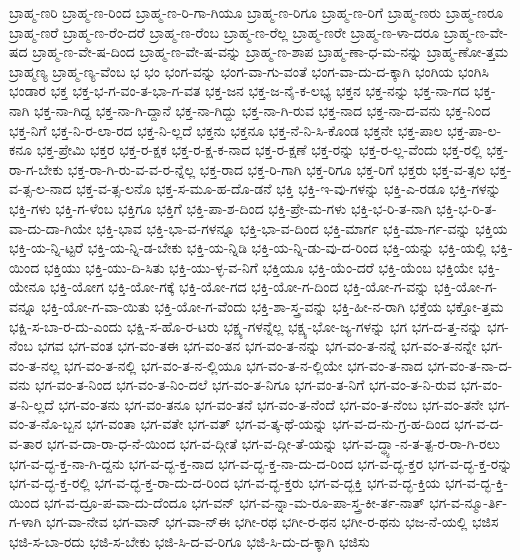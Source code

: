 {ಬ್ರಾಹ್ಮ-ಣರಿ
ಬ್ರಾಹ್ಮ-ಣ-ರಿಂದ
ಬ್ರಾಹ್ಮ-ಣ-ರಿ-ಗಾ-ಗಿಯೂ
ಬ್ರಾಹ್ಮ-ಣ-ರಿಗೂ
ಬ್ರಾಹ್ಮ-ಣ-ರಿಗೆ
ಬ್ರಾಹ್ಮ-ಣರು
ಬ್ರಾಹ್ಮ-ಣರೂ
ಬ್ರಾಹ್ಮ-ಣರೆ
ಬ್ರಾಹ್ಮ-ಣ-ರೆಂ-ದರೆ
ಬ್ರಾಹ್ಮ-ಣ-ರೆಂಬ
ಬ್ರಾಹ್ಮ-ಣ-ರೆಲ್ಲ
ಬ್ರಾಹ್ಮ-ಣರೇ
ಬ್ರಾಹ್ಮ-ಣ-ಳಾ-ದರೂ
ಬ್ರಾಹ್ಮ-ಣ-ವೇ-ಷದ
ಬ್ರಾಹ್ಮ-ಣ-ವೇ-ಷ-ದಿಂದ
ಬ್ರಾಹ್ಮ-ಣ-ವೇ-ಷ-ವನ್ನು
ಬ್ರಾಹ್ಮ-ಣ-ಶಾಪ
ಬ್ರಾಹ್ಮ-ಣಾ-ಧ-ಮ-ನನ್ನು
ಬ್ರಾಹ್ಮ-ಣೋ-ತ್ತಮ
ಬ್ರಾಹ್ಮಣ್ಯ
ಬ್ರಾಹ್ಮ-ಣ್ಯ-ವೆಂಬ
ಭ
ಭಂ
ಭಂಗ-ವನ್ನು
ಭಂಗ-ವಾ-ಗು-ವಂತೆ
ಭಂಗ-ವಾ-ದು-ದ-ಕ್ಕಾಗಿ
ಭಂಗಿಯ
ಭಂಗಿಸಿ
ಭಂಡಾರ
ಭಕ್ತ
ಭಕ್ತ-ಭ-ಗ-ವಂ-ತ-ಭಾ-ಗ-ವತ
ಭಕ್ತ-ಜನ
ಭಕ್ತ-ಜ-ನೈ-ಕ-ಲಭ್ಯ
ಭಕ್ತನ
ಭಕ್ತ-ನನ್ನು
ಭಕ್ತ-ನಾ-ಗದ
ಭಕ್ತ-ನಾಗಿ
ಭಕ್ತ-ನಾ-ಗಿದ್ದ
ಭಕ್ತ-ನಾ-ಗಿ-ದ್ದಾನೆ
ಭಕ್ತ-ನಾ-ಗಿದ್ದು
ಭಕ್ತ-ನಾ-ಗಿ-ರುವ
ಭಕ್ತ-ನಾದ
ಭಕ್ತ-ನಾ-ದ-ವನು
ಭಕ್ತ-ನಿಂದ
ಭಕ್ತ-ನಿಗೆ
ಭಕ್ತ-ನಿ-ರ-ಲಾ-ರದ
ಭಕ್ತ-ನಿ-ಲ್ಲದೆ
ಭಕ್ತನು
ಭಕ್ತನೂ
ಭಕ್ತ-ನೆ-ನಿ-ಸಿ-ಕೊಂಡ
ಭಕ್ತನೇ
ಭಕ್ತ-ಪಾಲ
ಭಕ್ತ-ಪಾ-ಲ-ಕನೂ
ಭಕ್ತ-ಪ್ರೇಮಿ
ಭಕ್ತರ
ಭಕ್ತ-ರ-ಕ್ಷಕ
ಭಕ್ತ-ರ-ಕ್ಷ-ಕ-ನಾದ
ಭಕ್ತ-ರ-ಕ್ಷಣೆ
ಭಕ್ತ-ರನ್ನು
ಭಕ್ತ-ರ-ಲ್ಲ-ವೆಂದು
ಭಕ್ತ-ರಲ್ಲಿ
ಭಕ್ತ-ರಾ-ಗ-ಬೇಕು
ಭಕ್ತ-ರಾ-ಗಿ-ರು-ವ-ವ-ರ-ನ್ನೆಲ್ಲ
ಭಕ್ತ-ರಾದ
ಭಕ್ತ-ರಿ-ಗಾಗಿ
ಭಕ್ತ-ರಿಗೂ
ಭಕ್ತ-ರಿಗೆ
ಭಕ್ತರು
ಭಕ್ತ-ವ-ತ್ಸಲ
ಭಕ್ತ-ವ-ತ್ಸ-ಲ-ನಾದ
ಭಕ್ತ-ವ-ತ್ಸ-ಲನೊ
ಭಕ್ತ-ಸ-ಮೂ-ಹ-ದೊ-ಡನೆ
ಭಕ್ತಿ
ಭಕ್ತಿ-ಇ-ವು-ಗಳನ್ನು
ಭಕ್ತಿ-ಎ-ರಡೂ
ಭಕ್ತಿ-ಗಳನ್ನು
ಭಕ್ತಿ-ಗಳು
ಭಕ್ತಿ-ಗ-ಳೆಂಬ
ಭಕ್ತಿಗೂ
ಭಕ್ತಿಗೆ
ಭಕ್ತಿ-ಪಾ-ಶ-ದಿಂದ
ಭಕ್ತಿ-ಪ್ರೇ-ಮ-ಗಳು
ಭಕ್ತಿ-ಭ-ರಿ-ತ-ನಾಗಿ
ಭಕ್ತಿ-ಭ-ರಿ-ತ-ವಾ-ದು-ದಾ-ಗಿಯೇ
ಭಕ್ತಿ-ಭಾವ
ಭಕ್ತಿ-ಭಾ-ವ-ಗಳನ್ನೂ
ಭಕ್ತಿ-ಭಾ-ವ-ದಿಂದ
ಭಕ್ತಿ-ಮಾರ್ಗ
ಭಕ್ತಿ-ಮಾ-ರ್ಗ-ವನ್ನು
ಭಕ್ತಿಯ
ಭಕ್ತಿ-ಯ-ನ್ನಿ-ಟ್ಟರೆ
ಭಕ್ತಿ-ಯ-ನ್ನಿ-ಡ-ಬೇಕು
ಭಕ್ತಿ-ಯ-ನ್ನಿಡಿ
ಭಕ್ತಿ-ಯ-ನ್ನಿ-ಡು-ವು-ದ-ರಿಂದ
ಭಕ್ತಿ-ಯನ್ನು
ಭಕ್ತಿ-ಯಲ್ಲಿ
ಭಕ್ತಿ-ಯಿಂದ
ಭಕ್ತಿಯು
ಭಕ್ತಿ-ಯು-ದಿ-ಸಿತು
ಭಕ್ತಿ-ಯು-ಳ್ಳ-ವ-ನಿಗೆ
ಭಕ್ತಿಯೂ
ಭಕ್ತಿ-ಯೆಂ-ದರೆ
ಭಕ್ತಿ-ಯೆಂಬ
ಭಕ್ತಿಯೇ
ಭಕ್ತಿ-ಯೇನೂ
ಭಕ್ತಿ-ಯೋಗ
ಭಕ್ತಿ-ಯೋ-ಗಕ್ಕೆ
ಭಕ್ತಿ-ಯೋ-ಗದ
ಭಕ್ತಿ-ಯೋ-ಗ-ದಿಂದ
ಭಕ್ತಿ-ಯೋ-ಗ-ವನ್ನು
ಭಕ್ತಿ-ಯೋ-ಗ-ವನ್ನೂ
ಭಕ್ತಿ-ಯೋ-ಗ-ವಾ-ಯಿತು
ಭಕ್ತಿ-ಯೋ-ಗ-ವೆಂದು
ಭಕ್ತಿ-ಶಾ-ಸ್ತ್ರ-ವನ್ನು
ಭಕ್ತಿ-ಹೀ-ನ-ರಾಗಿ
ಭಕ್ತೆಯ
ಭಕ್ತೋ-ತ್ತಮ
ಭಕ್ಷಿ-ಸ-ಬಾ-ರ-ದು-ಎಂದು
ಭಕ್ಷಿ-ಸ-ಹೊ-ರ-ಟರು
ಭಕ್ಷ್ಯ-ಗಳನ್ನೆಲ್ಲ
ಭಕ್ಷ್ಯ-ಭೋ-ಜ್ಯ-ಗಳನ್ನು
ಭಗ
ಭಗ-ದ-ತ್ತ-ನನ್ನು
ಭಗ-ನೆಂಬ
ಭಗವ
ಭಗ-ವಂತ
ಭಗ-ವಂ-ತಈ
ಭಗ-ವಂ-ತನ
ಭಗ-ವಂ-ತ-ನನ್ನು
ಭಗ-ವಂ-ತ-ನನ್ನೆ
ಭಗ-ವಂ-ತ-ನನ್ನೇ
ಭಗ-ವಂ-ತ-ನಲ್ಲ
ಭಗ-ವಂ-ತ-ನಲ್ಲಿ
ಭಗ-ವಂ-ತ-ನ-ಲ್ಲಿಯೂ
ಭಗ-ವಂ-ತ-ನ-ಲ್ಲಿಯೇ
ಭಗ-ವಂ-ತ-ನಾದ
ಭಗ-ವಂ-ತ-ನಾ-ದ-ವನು
ಭಗ-ವಂ-ತ-ನಿಂದ
ಭಗ-ವಂ-ತ-ನಿಂ-ದಲೆ
ಭಗ-ವಂ-ತ-ನಿಗೂ
ಭಗ-ವಂ-ತ-ನಿಗೆ
ಭಗ-ವಂ-ತ-ನಿ-ರುವ
ಭಗ-ವಂ-ತ-ನಿ-ಲ್ಲದೆ
ಭಗ-ವಂ-ತನು
ಭಗ-ವಂ-ತನೂ
ಭಗ-ವಂ-ತನೆ
ಭಗ-ವಂ-ತ-ನೆಂದೆ
ಭಗ-ವಂ-ತ-ನೆಂಬ
ಭಗ-ವಂ-ತನೇ
ಭಗ-ವಂ-ತ-ನೊ-ಬ್ಬನ
ಭಗ-ವಂತಾ
ಭಗ-ವತೇ
ಭಗ-ವತ್
ಭಗ-ವ-ತ್ಕ-ಥೆ-ಯನ್ನು
ಭಗ-ವ-ದ-ನು-ಗ್ರ-ಹ-ದಿಂದ
ಭಗ-ವ-ದ-ವ-ತಾರ
ಭಗ-ವ-ದಾ-ರಾ-ಧ-ನೆ-ಯಿಂದ
ಭಗ-ವ-ದ್ಗೀತೆ
ಭಗ-ವ-ದ್ಗೀ-ತೆ-ಯನ್ನು
ಭಗ-ವ-ದ್ಧ್ಯಾ-ನ-ತ-ತ್ಪ-ರ-ರಾ-ಗಿ-ರಲು
ಭಗ-ವ-ದ್ಭ-ಕ್ತ-ನಾ-ಗಿ-ದ್ದನು
ಭಗ-ವ-ದ್ಭ-ಕ್ತ-ನಾದ
ಭಗ-ವ-ದ್ಭ-ಕ್ತ-ನಾ-ದು-ದ-ರಿಂದ
ಭಗ-ವ-ದ್ಭ-ಕ್ತರ
ಭಗ-ವ-ದ್ಭ-ಕ್ತ-ರನ್ನು
ಭಗ-ವ-ದ್ಭ-ಕ್ತ-ರಲ್ಲಿ
ಭಗ-ವ-ದ್ಭ-ಕ್ತ-ರಾ-ದು-ದ-ರಿಂದ
ಭಗ-ವ-ದ್ಭ-ಕ್ತರು
ಭಗ-ವ-ದ್ಭಕ್ತಿ
ಭಗ-ವ-ದ್ಭ-ಕ್ತಿಯ
ಭಗ-ವ-ದ್ಭ-ಕ್ತಿ-ಯಿಂದ
ಭಗ-ವ-ದ್ರೂ-ಪ-ವಾ-ದು-ದೆಂದೂ
ಭಗ-ವನ್
ಭಗ-ವ-ನ್ನಾ-ಮ-ರೂ-ಪಾ-ಸ್ತ್ರ-ಕೀ-ರ್ತ-ನಾತ್
ಭಗ-ವ-ನ್ಮೂ-ರ್ತಿ-ಗ-ಳಾಗಿ
ಭಗ-ವಾ-ನೇವ
ಭಗ-ವಾನ್
ಭಗ-ವಾ-ನ್ಈ
ಭಗೀ-ರಥ
ಭಗೀ-ರ-ಥನ
ಭಗೀ-ರ-ಥನು
ಭಜ-ನೆ-ಯಲ್ಲಿ
ಭಜಿಸ
ಭಜಿ-ಸ-ಬಾ-ರದು
ಭಜಿ-ಸ-ಬೇಕು
ಭಜಿ-ಸಿ-ದ-ವ-ರಿಗೂ
ಭಜಿ-ಸಿ-ದು-ದ-ಕ್ಕಾಗಿ
ಭಜಿಸು
}
